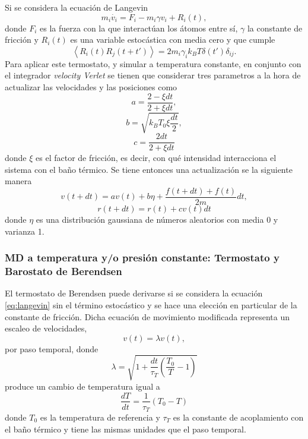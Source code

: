 Si se considera la ecuación de Langevin \cite{schneider1978}
\begin{equation}\label{eq:langevin}
    m_i \dot{v_i} = F_i - m_i \gamma v_i + R_i(t),
\end{equation}
donde $F_i$ es la fuerza con la que interactúan los átomos entre sí, $\gamma$ la
constante de fricción y $R_i(t)$ es una variable estocástica con media cero 
y que cumple
\begin{equation*}
\left\langle R_i(t) R_j(t+t') \right\rangle = 2m_i \gamma_i k_B T \delta(t') \delta_{ij}.
\end{equation*}
Para aplicar este termostato, y simular a temperatura constante, en conjunto con 
el integrador \textit{velocity Verlet} se tienen que considerar tres parametros
\cite{kroger2005} a la hora de actualizar las velocidades y las posiciones como
\begin{equation*}
a = \frac{2 - \xi dt}{2 + \xi dt},
\end{equation*}
\begin{equation*}
b= \sqrt{k_B T_0 \xi \frac{dt}{2}},
\end{equation*}
\begin{equation*}
c= \frac{2 dt}{2 + \xi dt}
\end{equation*}
donde $\xi$ es el factor de fricción, es decir, con qué intensidad interacciona 
el sistema con el baño térmico. Se tiene entonces una actualización se la siguiente
manera
\begin{equation*}
v(t+dt) = a v(t) + b \eta + \frac{f(t+dt)+f(t)}{2m} dt,
\end{equation*}
\begin{equation*}
r(t+dt) = r(t) + c v(t) dt
\end{equation*}
donde $\eta$ es una distribución gaussiana de números aleatorios con media 0 y
varianza 1. 

\subsubsection{MD a temperatura y/o presión constante: Termostato y Barostato 
de Berendsen}

El termostato de Berendsen \cite{berendsen1984} puede derivarse si se considera 
la ecuación \ref{eq:langevin} sin el término estocástico y se hace una elección
en particular de la constante de fricción. Dicha ecuación de movimiento modificada
representa un escaleo de velocidades, 
\begin{equation*}
v(t) = \lambda v(t),
\end{equation*}
por paso temporal, donde
\begin{equation*}
\lambda = \sqrt{1 + \frac{dt}{\tau_T} \left( \frac{T_0}{T} - 1 \right)}
\end{equation*}
produce un cambio de temperatura igual a
\begin{equation*}
\frac{dT}{dt} = \frac{1}{\tau_T} (T_0 - T)
\end{equation*}
donde $T_0$ es la temperatura de referencia y  $\tau_T$ es la constante de
acoplamiento con el baño térmico y tiene las mismas unidades que el paso temporal.

